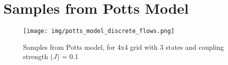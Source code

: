 \documentclass{article}
\begin{document}


\clearpage

\appendix

\section{Samples from Potts Model}
\label{appendix:potts}

\begin{figure}[h!]
\centering
\texttt{[image: img/potts\_model\_discrete\_flows.png]}
\caption{Samples from Potts model, for 4x4 grid with 3 states and coupling strength ($J$) = 0.1}
\end{figure}
\end{document}

